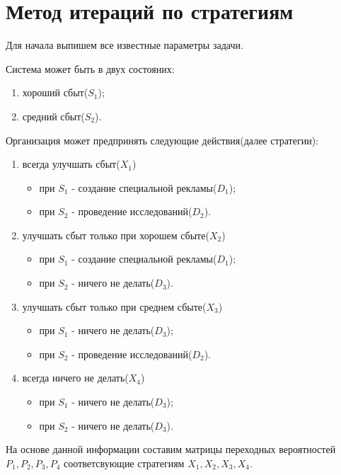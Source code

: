 \section{Метод итераций по стратегиям}
Для начала выпишем все известные параметры задачи. 

Система может быть в двух состояних:
\begin{enumerate}
\item хороший сбыт($S_1$);
\item средний сбыт($S_2$).
\end{enumerate}  
Организация может предпринять следующие действия(далее стратегии):
\begin{enumerate}
\item всегда улучшать сбыт($X_1$)
\begin{itemize}
\item при $S_1$ - создание специальной рекламы($D_1$);
\item при $S_2$ - проведение исследований($D_2$). 
\end{itemize}
\item улучшать сбыт только при хорошем сбыте($X_2$)
\begin{itemize}
\item при $S_1$ - создание специальной рекламы($D_1$);
\item при $S_2$ - ничего не делать($D_3$). 
\end{itemize}
\item улучшать сбыт только при среднем сбыте($X_3$)
\begin{itemize}
\item при $S_1$ - ничего не делать($D_3$);
\item при $S_2$ - проведение исследований($D_2$). 
\end{itemize}
\item всегда ничего не делать($X_4$)
\begin{itemize}
\item при $S_1$ - ничего не делать($D_3$);
\item при $S_2$ - ничего не делать($D_3$). 
\end{itemize}
\end{enumerate}

На основе данной информации составим матрицы переходных вероятностей $P_1, P_2, P_3, P_4$ соответсвующие стратегиям $X_1, X_2, X_3, X_4$.

